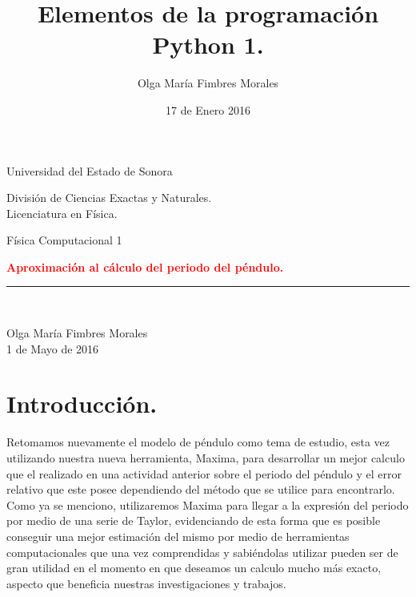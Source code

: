 \documentclass[12pt]{article}
\title{Elementos de la programación Python 1.}
\author{\textcolor{JungleGreen}{Olga María Fimbres Morales}}
\date{17 de Enero 2016}
\begin{document}
\begin{titlepage}

\begin{center}
\begin{large}
Universidad del Estado de Sonora\\
\end{large}
\vspace*{0.15in}
División de Ciencias Exactas y Naturales.\\
\vspace*{0.15in}
Licenciatura en Física. \\
\vspace*{0.6in}
\begin{large}
Física Computacional 1\\
\end{large}
\vspace*{0.2in}
\begin{Large}
\textbf{{\textcolor{Red}{Aproximación al cálculo del periodo del péndulo.}}} \\
\end{Large}


\rule{80mm}{0.1mm}\\
\vspace*{0.1in}
\begin{large}
{\textcolor{JungleGreen}{Olga María Fimbres Morales}}\\
1 de Mayo de 2016\\
\end{large}
\end{center}
\end{titlepage}

\pagebreak
\section*{Introducción.}
 Retomamos nuevamente el modelo de péndulo como tema de estudio, esta vez utilizando nuestra nueva herramienta, Maxima, para desarrollar un mejor calculo que el realizado en una actividad anterior sobre el periodo del péndulo y el error relativo que este posee dependiendo del método que se utilice para encontrarlo.\\
 
 Como ya se menciono, utilizaremos Maxima para llegar a la expresión del periodo por medio de una serie de Taylor, evidenciando de esta forma que es posible conseguir una mejor estimación del mismo por medio de herramientas computacionales que una vez comprendidas y sabiéndolas utilizar pueden ser de gran utilidad en el momento en que deseamos un calculo mucho más exacto, aspecto que beneficia nuestras investigaciones y trabajos.\\
 
\end{document}
